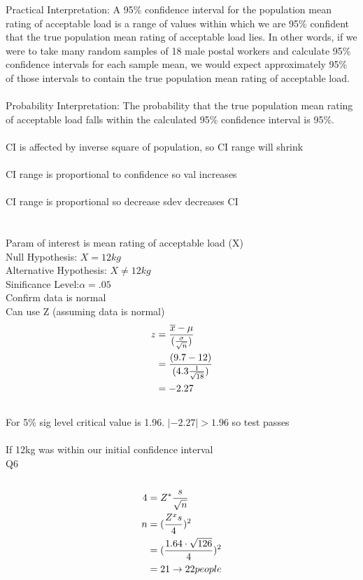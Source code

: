 \documentclass{article}
\begin{document}
Practical Interpretation: A 95\% confidence interval for the population mean rating of acceptable load is a range of values within which we are 95\% confident that the true population mean rating of acceptable load lies. In other words, if we were to take many random samples of 18 male postal workers and calculate 95\% confidence intervals for each sample mean, we would expect approximately 95\% of those intervals to contain the true population mean rating of acceptable load.\\\\
Probability Interpretation: The probability that the true population mean rating of acceptable load falls within the calculated 95\% confidence interval is 95\%.\\\\
CI is affected by inverse square of population, so  CI range will shrink\\\\
CI range is proportional to  confidence so val increases\\\\
CI range is proportional so decrease sdev decreases CI\\\\
\\
Param of interest is mean rating of acceptable load (X)\\
Null Hypothesis: $X = 12kg$\\
Alternative Hypothesis: $X \neq 12kg$\\
Sinificance Level:$\alpha = .05$\\
Confirm data is normal\\
Can use Z (assuming data is normal)\\
\begin{equation*}
\begin{split}
z & = {\overline x - \mu \over ({\sigma \over \sqrt{n}})}\\
& = {(9.7 - 12) \over (4.3 {1\over\sqrt{18}}) }\\
& = -2.27
\end{split}
\end{equation*}
\\
For 5\% sig level critical value is 1.96. $|-2.27| > 1.96 $ so test passes\\\\
If 12kg was within our initial confidence interval
\\

Q6\\\\
\begin{equation*}
\begin{split}
4 & = Z^* {s \over \sqrt{n}}\\
n &= ({Z^x s \over 4})^2\\
& =  ({1.64 \cdot \sqrt{126} \over 4} )^2\\
& = 21 \rightarrow 22 people
\end{split}
\end{equation*}
\end{document}

